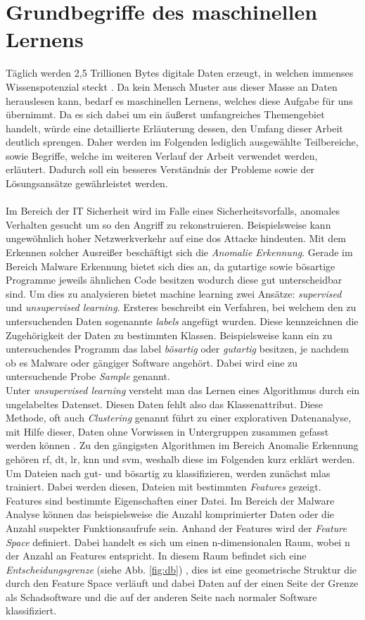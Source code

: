 \documentclass[
    12pt, %
    DIV10,
    ngerman, %
    a4paper, %
    oneside, %
    titlepage, %
    parskip=half, %
    headings=normal, %
    listof=totoc, %
    bibliography=totoc, %
    index=totoc, %
    captions=tableheading, %
    final %
]{scrreprt}
\begin{document}
\section{Grundbegriffe des maschinellen Lernens}
Täglich werden 2,5 Trillionen Bytes digitale Daten erzeugt, in welchen immenses Wissenspotenzial steckt \parencite{MerlinOne}. Da kein Mensch Muster aus dieser Masse an Daten herauslesen kann, bedarf es maschinellen Lernens, welches diese Aufgabe für uns übernimmt. Da es sich dabei um ein äußerst umfangreiches Themengebiet handelt, würde eine detaillierte Erläuterung dessen, den Umfang dieser Arbeit deutlich sprengen. Daher werden im Folgenden lediglich ausgewählte Teilbereiche, sowie Begriffe, welche im weiteren Verlauf der Arbeit verwendet werden, erläutert. Dadurch soll ein besseres Verständnis der Probleme sowie der Lösungsansätze gewährleistet werden.\\\\
Im Bereich der IT Sicherheit wird im Falle eines Sicherheitsvorfalls, anomales Verhalten gesucht um so den Angriff zu rekonstruieren. Beispielsweise kann ungewöhnlich hoher Netzwerkverkehr auf eine \ac{dos} Attacke hindeuten. Mit dem Erkennen solcher Ausreißer beschäftigt sich die \emph{Anomalie Erkennung}. Gerade im Bereich Malware Erkennung bietet sich dies an, da gutartige sowie bösartige Programme jeweils ähnlichen Code besitzen wodurch diese gut unterscheidbar sind. Um dies zu analysieren bietet machine learning zwei Ansätze: \emph{supervised} und \emph{unsupervised learning}. Ersteres beschreibt ein Verfahren, bei welchem den zu untersuchenden Daten sogenannte \emph{labels} angefügt wurden. Diese kennzeichnen die Zugehörigkeit der Daten zu bestimmten Klassen. Beispielsweise kann ein zu untersuchendes Programm das label \emph{bösartig} oder \emph{gutartig} besitzen, je nachdem ob es Malware oder gängiger Software angehört. Dabei wird eine zu untersuchende Probe \emph{Sample} genannt.\\
Unter \emph{unsupervised learning} versteht man das Lernen eines Algorithmus durch ein ungelabeltes Datenset. Diesen Daten fehlt also das Klassenattribut. Diese Methode, oft auch \emph{Clustering} genannt führt zu einer explorativen Datenanalyse, mit Hilfe dieser, Daten ohne Vorwissen in Untergruppen zusammen gefasst werden können \parencite{raschka2017python}.
Zu den gängigsten Algorithmen im Bereich Anomalie Erkennung gehören \ac{rf}, \ac{dt}, \ac{lr}, \ac{knn} und \ac{svm}, weshalb diese im Folgenden kurz erklärt werden.\\
Um Dateien nach gut- und bösartig zu klassifizieren, werden zunächst \ac{mlas} trainiert. Dabei werden diesen, Dateien mit bestimmten \emph{Features} gezeigt. Features sind bestimmte Eigenschaften einer Datei. Im Bereich der Malware Analyse können das beispielsweise die Anzahl komprimierter Daten oder die Anzahl suspekter Funktionsaufrufe sein. Anhand der Features wird der \emph{Feature Space} definiert. Dabei handelt es sich um einen n-dimensionalen Raum, wobei n der Anzahl an Features entspricht. In diesem Raum befindet sich eine \emph{Entscheidungsgrenze} (siehe Abb. \ref{fig:db}) , dies ist eine geometrische Struktur die durch den Feature Space verläuft und dabei Daten auf der einen Seite der Grenze als Schadsoftware und die auf der anderen Seite nach normaler Software klassifiziert.
\end{document}
